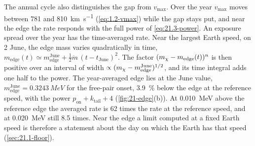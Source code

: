 The annual cycle also distinguishes the gap from $v_{\mathrm{max}}$. Over the year $v_{\mathrm{max}}$ moves between 781 and \SI{810}{km.s^{-1}} (\cref{eq:1.2-vmax}) while the gap stays put, and near the edge the rate responds with the full power of \cref{eq:21.3-power}. An exposure spread over the year has the time-averaged rate. Near the largest Earth speed, on 2 June, the edge mass varies quadratically in time, $m_{\mathrm{edge}}(t) \simeq m_{\mathrm{edge}}^{\mathrm{June}} + \tfrac12\ddot m\,(t - t_{\mathrm{June}})^2$. The factor $(m_{\chi} - m_{\mathrm{edge}}(t))^{n}$ is then positive over an interval of width $\propto (m_{\chi} - m_{\mathrm{edge}}^{\mathrm{June}})^{1/2}$, and its time integral adds one half to the power. The year-averaged edge lies at the June value, $m_{\mathrm{edge}}^{\mathrm{June}} = \SI{0.3243}{MeV}$ for the free-pair onset, \SI{3.9}{\percent} below the edge at the reference speed, with the power $p_{\mathrm{on}} + k_{\mathrm{tail}} + 4$ (\cref{fig:21-edge}(b)). At \SI{0.010}{MeV} above the reference edge the averaged rate is 62 times the rate at the reference speed, and at \SI{0.020}{MeV} still 8.5 times. Near the edge a limit computed at a fixed Earth speed is therefore a statement about the day on which the Earth has that speed (\cref{sec:21.1-floor}).

